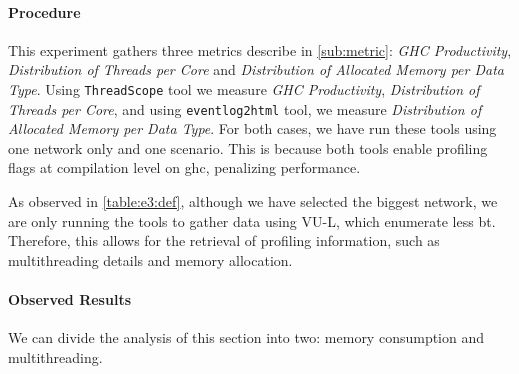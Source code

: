 \paragraph{Procedure} This experiment gathers three metrics describe in \autoref{sub:metric}: \emph{GHC Productivity}, \emph{Distribution of Threads per Core} and \emph{Distribution of Allocated Memory per Data Type}.
Using \texttt{ThreadScope} \cite{threadscope} tool we measure \emph{GHC Productivity}, \emph{Distribution of Threads per Core}, and using \texttt{eventlog2html} \cite{eventlog2html} tool, we measure \emph{Distribution of Allocated Memory per Data Type}.
For both cases, we have run these tools using one network only and one scenario. This is because both tools enable profiling flags at compilation level on \acrshort{ghc}, penalizing performance.

\begin{table}[H]
\centering
{}
\caption[{[EE] E3 Procedure}]{This table shows the experiments scenario run for each of the tools. Notice the increase of \texttt{-A} and \texttt{-H} to support more memory allocation due to the profiling analysis}
\label{table:e3:def}
\end{table}

As observed in \autoref{table:e3:def}, although we have selected the biggest network, we are only running the tools to gather data using VU-L, which enumerate less \acrshort{bt}. Therefore, this allows for the retrieval of profiling information, such as multithreading details and memory allocation.

\paragraph{Observed Results}\label{sub:sec:res:e3}
We can divide the analysis of this section into two: memory consumption and multithreading.

